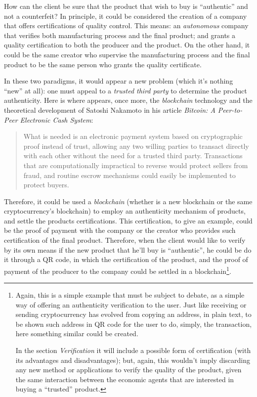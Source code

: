 \documentclass[12pt,a4paper]{article}
\begin{document}
How can the client be sure that the product that wish to buy is “authentic” and not a counterfeit? In principle, it could be considered the creation of a company that offers certifications of quality control. This means: an \textit{autonomous} company that verifies both manufacturing process and the final product; and grants a quality certification to both the producer and the product. On the other hand, it could be the same creator who supervise the manufacturing process and the final product to be the same person who grants the quality certificate.

In these two paradigms, it would appear a new problem (which it's nothing “new” at all): one must appeal to a \textit{trusted third party} to determine the product authenticity. Here is where appears, once more, the \textit{blockchain} technology and the theoretical development of Satoshi Nakamoto in his article \textit{Bitcoin: A Peer-to-Peer Electronic Cash System}:

\begin{quotation}
What is needed is an electronic payment system based on cryptographic proof instead of trust, allowing any two willing parties to transact directly with each other without the need for a trusted third party. Transactions that are computationally impractical to reverse would protect sellers from fraud, and routine escrow mechanisms could easily be implemented to protect buyers. \cite[p.~1]{bitcoin}
\end{quotation}

Therefore, it could be used a \textit{blockchain} (whether is a new blockchain or the same cryptocurrency's blockchain) to employ an authenticity mechanism of products, and settle the products certifications. This certification, to give an example, could be the proof of payment with the company or the creator who provides such certification of the final product. Therefore, when the client would like to verify by its own means if the new product that he'll buy is “authentic”, he could be do it through a QR code, in which the certification of the product, and the proof of payment of the producer to the company could be settled in a blockchain\footnote{Again, this is a simple example that must be subject to debate, as a simple way of offering an authenticity verification to the user. Just like receiving or sending cryptocurrency has evolved from copying an address, in plain text, to be shown such address in QR code for the user to do, simply, the transaction, here something similar could be created.

In the section \textit{Verification} it will include a possible form of certification (with its advantages and disadvantages); but, again, this wouldn't imply discarding any new method or applications to verify the quality of the product, given the same interaction between the economic agents that are interested in buying a “trusted” product.}.
\end{document}
